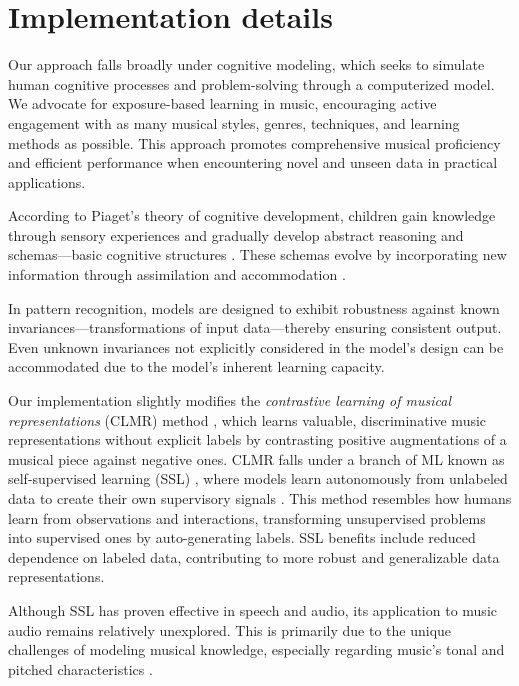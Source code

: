 \section{Implementation details}

Our approach falls broadly under cognitive modeling, which seeks to simulate human cognitive processes and problem-solving through a computerized model. We advocate for exposure-based learning in music, encouraging active engagement with as many musical styles, genres, techniques, and learning methods as possible. This approach promotes comprehensive musical proficiency and efficient performance when encountering novel and unseen data in practical applications.

According to Piaget's theory of cognitive development, children gain knowledge through sensory experiences and gradually develop abstract reasoning and schemas—basic cognitive structures \cite{Huitt2003PiagetsDevelopment}. These schemas evolve by incorporating new information through assimilation and accommodation \cite{audioselfsupsurvey}.

In pattern recognition, models are designed to exhibit robustness against known invariances—transformations of input data—thereby ensuring consistent output. Even unknown invariances not explicitly considered in the model's design can be accommodated due to the model's inherent learning capacity.

Our implementation slightly modifies the \textit{contrastive learning of musical representations} (CLMR) method \cite{CLMR2021}, which learns valuable, discriminative music representations without explicit labels by contrasting positive augmentations of a musical piece against negative ones. CLMR falls under a branch of ML known as self-supervised learning (SSL) \cite{Balestriero2023ALearning}, where models learn autonomously from unlabeled data to create their own supervisory signals \cite{audioselfsupsurvey}. This method resembles how humans learn from observations and interactions, transforming unsupervised problems into supervised ones by auto-generating labels. SSL benefits include reduced dependence on labeled data, contributing to more robust and generalizable data representations.

Although SSL has proven effective in speech and audio, its application to music audio remains relatively unexplored. This is primarily due to the unique challenges of modeling musical knowledge, especially regarding music's tonal and pitched characteristics \cite{Li2023MERT:Training}.

